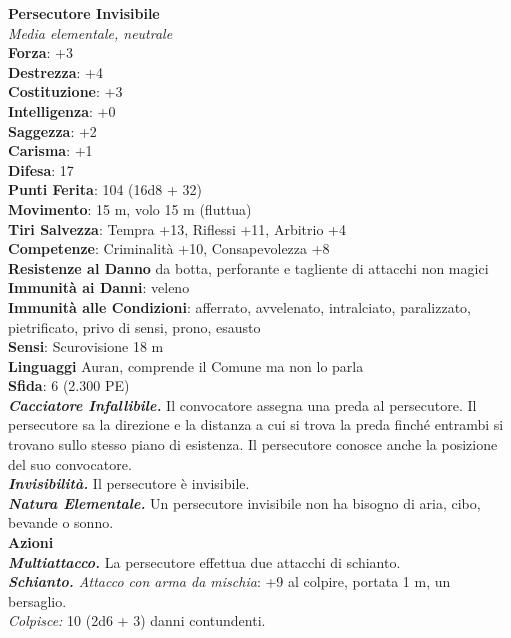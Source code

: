 \begin{multicols}{2}
\medskip\textbf{Persecutore Invisibile}\\
\emph{Media elementale, neutrale}\\
\textbf{Forza}: +3\\
\textbf{Destrezza}: +4\\
\textbf{Costituzione}: +3\\
\textbf{Intelligenza}: +0\\
\textbf{Saggezza}: +2\\
\textbf{Carisma}: +1\\
\textbf{Difesa}: 17\\
\textbf{Punti Ferita}: 104 (16d8 + 32)\\
\textbf{Movimento}: 15 m, volo 15 m (fluttua)\\
\textbf{Tiri Salvezza}: Tempra +13, Riflessi +11, Arbitrio +4\\
\textbf{Competenze}: Criminalità +10, Consapevolezza +8\\
\textbf{Resistenze al Danno} da botta, perforante e tagliente di attacchi non magici\\
\textbf{Immunità ai Danni}: veleno\\
\textbf{Immunità alle Condizioni}: afferrato, avvelenato, intralciato, paralizzato, pietrificato, privo di sensi, prono, esausto\\
\textbf{Sensi}: Scurovisione 18 m\\
\textbf{Linguaggi} Auran, comprende il Comune ma non lo parla \\
\textbf{Sfida}: 6 (2.300 PE)\smallskip\\
\emph{\textbf{Cacciatore Infallibile.}} Il convocatore assegna una preda al persecutore. Il persecutore sa la direzione e la distanza a cui si trova la preda finché entrambi si trovano sullo stesso piano di esistenza. Il persecutore conosce anche la posizione del suo convocatore.\\
\emph{\textbf{Invisibilità.}} Il persecutore è invisibile.\\
\emph{\textbf{Natura Elementale.}} Un persecutore invisibile non ha bisogno di aria, cibo, bevande o sonno.\\
\smallskip\textbf{Azioni}\\
\emph{\textbf{Multiattacco.}} La persecutore effettua due attacchi di schianto.\\
\emph{\textbf{Schianto.} Attacco con arma da mischia}: +9 al colpire, portata 1 m, un bersaglio.\\
\emph{Colpisce:} 10 (2d6 + 3) danni contundenti.\\


\end{multicols}
